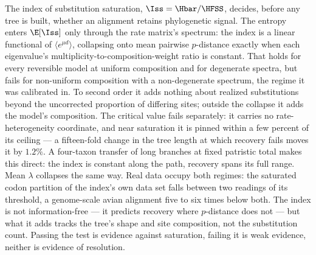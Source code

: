 The index of substitution saturation, $\Iss=\Hbar/\HFSS$, decides, before any
tree is built, whether an alignment retains phylogenetic signal. The entropy
enters $\E[\Iss]$ only through the rate matrix's spectrum: the index is a
linear functional of $\langle e^{\mu d}\rangle$, collapsing onto mean pairwise
$p$-distance exactly when each eigenvalue's multiplicity-to-composition-weight
ratio is constant. That holds for every reversible model at uniform composition
and for degenerate spectra, but fails for non-uniform composition with a
non-degenerate spectrum, the regime it was calibrated in. To second order it
adds nothing about realized substitutions beyond the uncorrected proportion of
differing sites; outside the collapse it adds the model's composition. The
critical value fails separately: it carries no rate-heterogeneity coordinate,
and near saturation it is pinned within a few percent of its ceiling --- a
fifteen-fold change in the tree length at which recovery fails moves it by
$1.2\%$. A four-taxon transfer of long branches at fixed patristic total makes
this direct: the index is constant along the path, recovery spans its full
range. Mean $\lambda$ collapses the same way. Real data occupy both regimes:
the saturated codon partition of the index's own data set falls between two
readings of its threshold, a genome-scale avian alignment five to six times
below both. The index is not information-free --- it predicts recovery where
$p$-distance does not --- but what it adds tracks the tree's shape and site
composition, not the substitution count. Passing the test is evidence against
saturation, failing it is weak evidence, neither is evidence of resolution.
